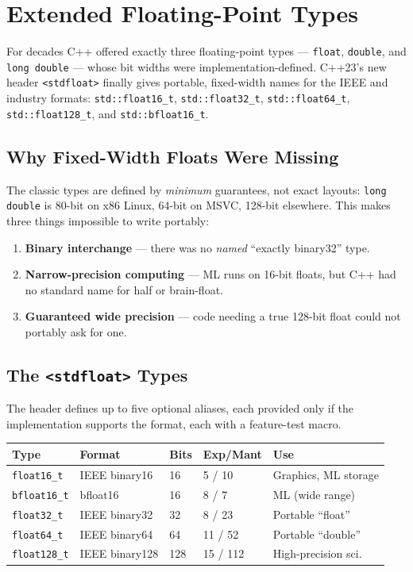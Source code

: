 \chapter{Extended Floating-Point Types}
\label{ch:extended-floating-point-types}

For decades C++ offered exactly three floating-point types --- \lstinline|float|, \lstinline|double|, and \lstinline|long double| --- whose bit widths were implementation-defined. C++23's new header \lstinline|<stdfloat>| finally gives portable, fixed-width names for the IEEE and industry formats: \lstinline|std::float16_t|, \lstinline|std::float32_t|, \lstinline|std::float64_t|, \lstinline|std::float128_t|, and \lstinline|std::bfloat16_t|.

\section{Why Fixed-Width Floats Were Missing}

The classic types are defined by \emph{minimum} guarantees, not exact layouts: \lstinline|long double| is 80-bit on x86 Linux, 64-bit on MSVC, 128-bit elsewhere. This makes three things impossible to write portably:

\begin{enumerate}
    \item \textbf{Binary interchange} --- there was no \emph{named} ``exactly binary32'' type.
    \item \textbf{Narrow-precision computing} --- ML runs on 16-bit floats, but C++ had no standard name for half or brain-float.
    \item \textbf{Guaranteed wide precision} --- code needing a true 128-bit float could not portably ask for one.
\end{enumerate}

\section{The \texttt{<stdfloat>} Types}

The header defines up to five optional aliases, each provided only if the implementation supports the format, each with a feature-test macro.

\begin{center}
\begin{tabular}{lllll}
\textbf{Type} & \textbf{Format} & \textbf{Bits} & \textbf{Exp/Mant} & \textbf{Use} \\
\hline
\lstinline|float16_t|  & IEEE binary16 & 16  & 5 / 10  & Graphics, ML storage \\
\lstinline|bfloat16_t| & bfloat16      & 16  & 8 / 7   & ML (wide range) \\
\lstinline|float32_t|  & IEEE binary32 & 32  & 8 / 23  & Portable ``float'' \\
\lstinline|float64_t|  & IEEE binary64 & 64  & 11 / 52 & Portable ``double'' \\
\lstinline|float128_t| & IEEE binary128& 128 & 15 / 112& High-precision sci. \\
\end{tabular}
\end{center}

